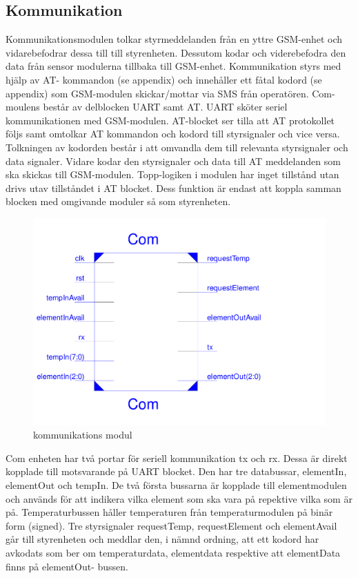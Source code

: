 \documentclass[a4paper]{scrartcl}
\begin{document}
	\subsection{Kommunikation}
		Kommunikationsmodulen tolkar styrmeddelanden från en yttre GSM-enhet och vidarebefodrar  dessa till till styrenheten. Dessutom kodar och viderebefodra den data från sensor modulerna tillbaka till GSM-enhet. Kommunikation styrs med hjälp 			av AT-	kommandon (se appendix) och innehåller ett fåtal kodord (se appendix) som GSM-modulen skickar/mottar  via SMS från operatören. 
		Com-moulens består av delblocken UART samt AT. UART sköter seriel kommunikationen med GSM-modulen. AT-blocket ser tilla att AT protokollet följs samt omtolkar AT kommandon och kodord till styrsignaler och vice versa. 
		Tolkningen av kodorden består i att omvandla dem till relevanta styrsignaler och data signaler. Vidare kodar den styrsignaler och data till AT meddelanden som ska skickas till GSM-modulen.
		Topp-logiken i modulen har inget tillstånd utan drivs utav tillståndet i AT blocket. Dess funktion är endast att koppla samman blocken med omgivande moduler så som styrenheten.
			\begin{figure}[H]
				\centering
				\includegraphics[scale=0.4]{comschematic.pdf}
				\caption{kommunikations modul}
			\end{figure}

		Com enheten har två portar för seriell kommunikation tx och rx. Dessa är direkt kopplade till motsvarande på UART blocket.
		Den har tre databussar, elementIn, elementOut och tempIn. De två första bussarna är kopplade till elementmodulen och används för att indikera vilka element som ska vara på repektive vilka som är på. Temperaturbussen håller temperaturen 			från temperaturmodulen på binär form (signed).
		Tre styrsignaler requestTemp, requestElement och elementAvail går till styrenheten och meddlar den, i nämnd ordning,  att ett kodord har avkodats som ber om temperaturdata, elementdata respektive att elementData finns på elementOut-				bussen.
\end{document}
